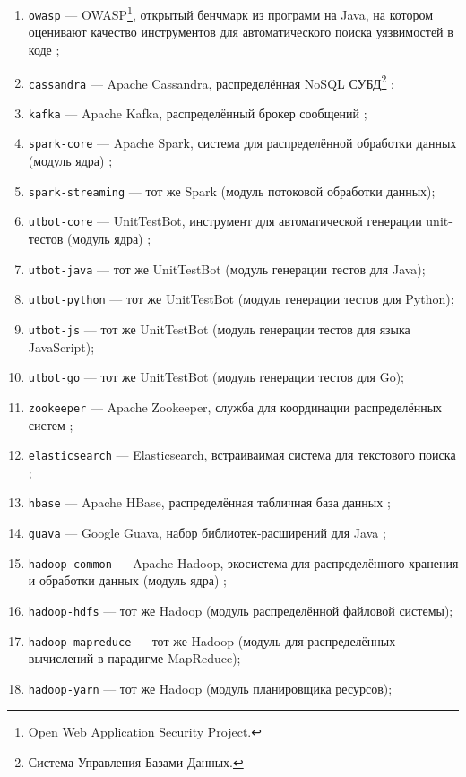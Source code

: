 \begin{enumerate}
    \item \texttt{owasp} --- OWASP\footnote{Open Web Application Security Project.}, открытый бенчмарк из программ на Java, на котором оценивают качество инструментов для автоматического поиска уязвимостей в коде \cite{owasp-website};
    \item \texttt{cassandra} --- Apache Cassandra, распределённая NoSQL СУБД\footnote{Система Управления Базами Данных.} \cite{cassandra-website};
    \item \texttt{kafka} --- Apache Kafka, распределённый брокер сообщений \cite{kafka-website};
    \item \texttt{spark-core} --- Apache Spark, система для распределённой обработки данных (модуль ядра) \cite{spark-website};
    \item \texttt{spark-streaming} --- тот же Spark (модуль потоковой обработки данных);
    \item \texttt{utbot-core} --- UnitTestBot, инструмент для автоматической генерации unit-тестов (модуль ядра) \cite{utbot-github};
    \item \texttt{utbot-java} --- тот же UnitTestBot (модуль генерации тестов для Java);
    \item \texttt{utbot-python} --- тот же UnitTestBot (модуль генерации тестов для Python);
    \item \texttt{utbot-js} --- тот же UnitTestBot (модуль генерации тестов для языка JavaScript);
    \item \texttt{utbot-go} --- тот же UnitTestBot (модуль генерации тестов для Go);
    \item \texttt{zookeeper} --- Apache Zookeeper, служба для координации распределённых систем \cite{zookeeper-website};
    \item \texttt{elasticsearch} --- Elasticsearch, встраиваимая система для текстового поиска \cite{elasticsearch-website};
    \item \texttt{hbase} --- Apache HBase, распределённая табличная база данных \cite{hbase-website};
    \item \texttt{guava} --- Google Guava, набор библиотек-расширений для Java \cite{guava-website};
    \item \texttt{hadoop-common} --- Apache Hadoop, экосистема для распределённого хранения и обработки данных (модуль ядра) \cite{hadoop-website};
    \item \texttt{hadoop-hdfs} --- тот же Hadoop (модуль распределённой файловой системы);
    \item \texttt{hadoop-mapreduce} --- тот же Hadoop (модуль для распределённых вычислений в парадигме MapReduce);
    \item \texttt{hadoop-yarn} --- тот же Hadoop (модуль планировщика ресурсов);
\end{enumerate}

